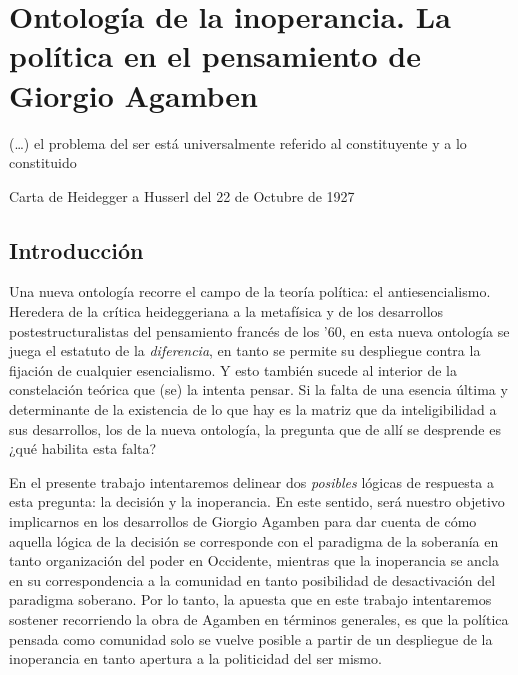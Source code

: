 \documentclass{book}
\begin{document}
\chapter{Ontología de la inoperancia. La política en el pensamiento de Giorgio Agamben}
\author{Manuel Moyano}

(\dots) el problema del ser está universalmente referido al
constituyente y a lo constituido

Carta de Heidegger a Husserl del 22 de Octubre de 1927

\section{Introducción}

Una nueva ontología recorre el campo de la teoría política: el
antiesencialismo. Heredera de la crítica heideggeriana a la metafísica y
de los desarrollos postestructuralistas del pensamiento francés de los
'60, en esta nueva ontología se juega el estatuto de la
\emph{diferencia}, en tanto se permite su despliegue contra la fijación
de cualquier esencialismo. Y esto también sucede al interior de la
constelación teórica que (se) la intenta pensar. Si la falta de una
esencia última y determinante de la existencia de lo que hay es la
matriz que da inteligibilidad a sus desarrollos, los de la nueva
ontología, la pregunta que de allí se desprende es ¿qué habilita esta
falta?

En el presente trabajo intentaremos delinear dos \emph{posibles} lógicas
de respuesta a esta pregunta: la decisión y la inoperancia. En este
sentido, será nuestro objetivo implicarnos en los desarrollos de Giorgio
Agamben para dar cuenta de cómo aquella lógica de la decisión se
corresponde con el paradigma de la soberanía en tanto organización del
poder en Occidente, mientras que la inoperancia se ancla en su
correspondencia a la comunidad en tanto posibilidad de desactivación del
paradigma soberano. Por lo tanto, la apuesta que en este trabajo
intentaremos sostener recorriendo la obra de Agamben en términos
generales, es que la política pensada como comunidad solo se vuelve
posible a partir de un despliegue de la inoperancia en tanto apertura a
la politicidad del ser mismo.
\end{document}
